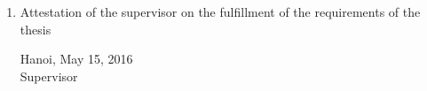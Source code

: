 \begin{requirement}
\begin{enumerate}[leftmargin=*]
	\item Attestation of the supervisor on the fulfillment of the requirements of the thesis
		\vspace{30pt}		
		\begin{flushright}
			\begin{minipage}{0.5\linewidth}
				\centering
				Hanoi, May 15, 2016\\
				Supervisor\\
				\vspace{30pt}
				\supervisor
			\end{minipage}	
		\end{flushright}
\end{enumerate}
\end{requirement}